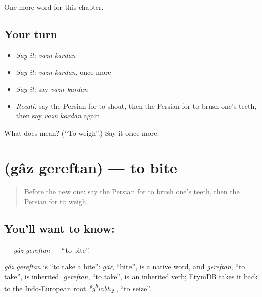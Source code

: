 \begin{grammarlens}[title={What you've built}]
One more word for this chapter.
\end{grammarlens}

\subsection*{Your turn}
\begin{itemize}
\raggedright
  \item \emph{Say it:} \emph{vazn kardan}
  \item \emph{Say it:} \emph{vazn kardan}, once more
  \item \emph{Say it:} say \emph{vazn kardan}
  \item \emph{Recall:} say the Persian for to shout, then the Persian for to brush one's teeth, then say \emph{vazn kardan} again
\end{itemize}

\begin{tcolorbox}[breakable,colback=teal!4,colframe=teal!35!black,title={Before you move on}]
What does   mean? (\textquotedblleft{}To weigh\textquotedblright{}.) Say it once more.
\end{tcolorbox}
\section[\texorpdfstring{\fa{گاز} \fa{گرفتن} (gâz gereftan)}{گاز گرفتن (gâz gereftan)}]{  (gâz gereftan) — to bite}

\label{lesson:FA-C255-gaz-gereftan}



\begin{quote}
Before the new one: say the Persian for to brush one's teeth, then the Persian for to weigh.
\end{quote}

\subsection*{You'll want to know:  }
\textbf{ } — \emph{gâz gereftan} — \textquotedblleft{}to bite\textquotedblright{}.

\begin{cousinweb}
\emph{gâz gereftan} is \textquotedblleft{}to take a bite\textquotedblright{}: \emph{gâz}, \textquotedblleft{}bite\textquotedblright{}, is a native word, and \emph{gereftan}, \textquotedblleft{}to take\textquotedblright{}, is inherited. \emph{gereftan}, \textquotedblleft{}to take\textquotedblright{}, is an inherited verb; EtymDB takes it back to the Indo-European root \emph{*g\textsuperscript{h}rebh\textsubscript{2}-}, \textquotedblleft{}to seize\textquotedblright{}.
\end{cousinweb}

